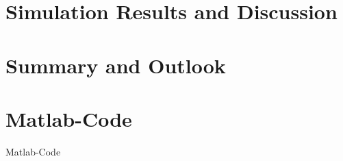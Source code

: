 \documentclass[11pt]{scrartcl}
\begin{document}
\section{Simulation Results and Discussion}

\section{Summary and Outlook}

\appendix
\section{Matlab-Code}

Matlab-Code







\end{document}
